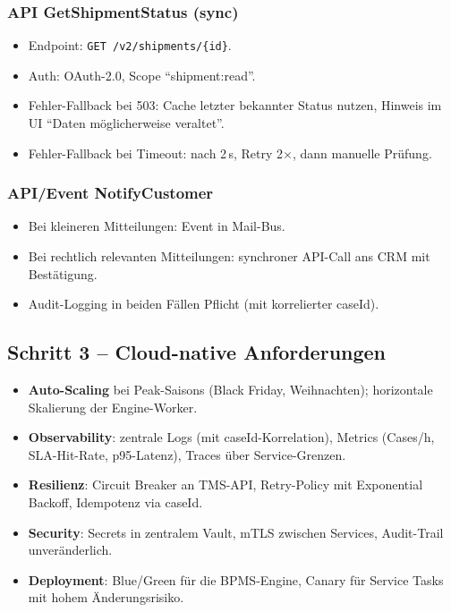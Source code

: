 \documentclass[11pt,a4paper,oneside]{article}
\newcommand{\fachbegriff}[1]{\textbf{#1}}
\begin{document}
\subsubsection{API GetShipmentStatus (sync)}

\begin{itemize}
  \item Endpoint: \texttt{GET /v2/shipments/\{id\}}.
  \item Auth: OAuth-2.0, Scope ``shipment:read''.
  \item Fehler-Fallback bei 503: Cache letzter bekannter Status nutzen, Hinweis im UI ``Daten möglicherweise veraltet''.
  \item Fehler-Fallback bei Timeout: nach 2\,s, Retry 2$\times$, dann manuelle Prüfung.
\end{itemize}

\subsubsection{API/Event NotifyCustomer}

\begin{itemize}
  \item Bei kleineren Mitteilungen: Event in Mail-Bus.
  \item Bei rechtlich relevanten Mitteilungen: synchroner API-Call ans CRM mit Bestätigung.
  \item Audit-Logging in beiden Fällen Pflicht (mit korrelierter caseId).
\end{itemize}

\subsection{Schritt 3 -- Cloud-native Anforderungen}

\begin{itemize}
  \item \fachbegriff{Auto-Scaling} bei Peak-Saisons (Black Friday, Weihnachten); horizontale Skalierung der Engine-Worker.
  \item \fachbegriff{Observability}: zentrale Logs (mit caseId-Korrelation), Metrics (Cases/h, SLA-Hit-Rate, p95-Latenz), Traces über Service-Grenzen.
  \item \fachbegriff{Resilienz}: Circuit Breaker an TMS-API, Retry-Policy mit Exponential Backoff, Idempotenz via caseId.
  \item \fachbegriff{Security}: Secrets in zentralem Vault, mTLS zwischen Services, Audit-Trail unveränderlich.
  \item \fachbegriff{Deployment}: Blue/Green für die BPMS-Engine, Canary für Service Tasks mit hohem Änderungsrisiko.
\end{itemize}
\end{document}
